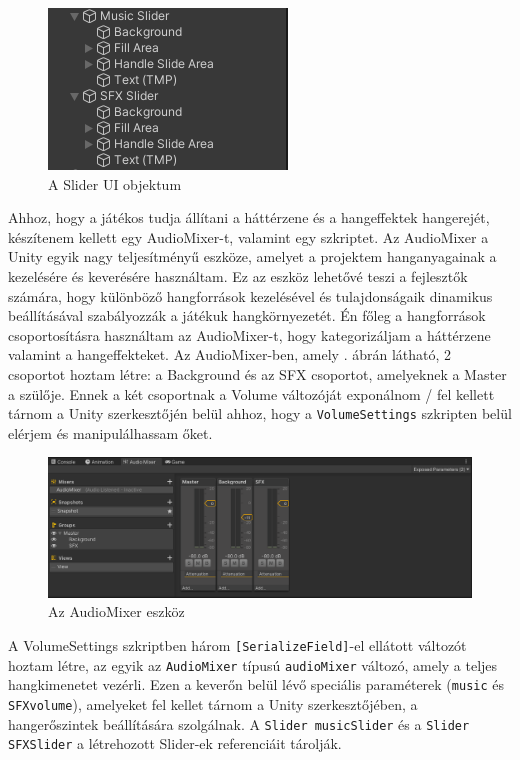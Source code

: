 \begin{figure}[ht]
\centering
\includegraphics[scale = 0.7]{images/slider.png}
\caption{A Slider UI objektum}
\label{fig:slider}
\end{figure}

\newpage
Ahhoz, hogy a játékos tudja állítani a háttérzene és a hangeffektek hangerejét, készítenem kellett egy AudioMixer-t, valamint egy szkriptet. Az AudioMixer a Unity egyik nagy teljesítményű eszköze, amelyet a projektem hanganyagainak a kezelésére és keverésére használtam. Ez az eszköz lehetővé teszi a fejlesztők számára, hogy különböző hangforrások kezelésével és tulajdonságaik dinamikus beállításával szabályozzák a játékuk hangkörnyezetét. Én főleg a hangforrások csoportosításra használtam az AudioMixer-t, hogy kategorizáljam a háttérzene valamint a hangeffekteket. Az AudioMixer-ben, amely . ábrán látható, 2 csoportot hoztam létre: a Background és az SFX csoportot, amelyeknek a Master a szülője. Ennek a két csoportnak a Volume változóját exponálnom / fel kellett tárnom a Unity szerkesztőjén belül ahhoz, hogy a \texttt{VolumeSettings} szkripten belül elérjem és manipulálhassam őket.

\begin{figure}
\centering
\includegraphics[scale = 0.4]{images/audiomixer.png}
\caption{Az AudioMixer eszköz}
\label{fig:audiomixer}
\end{figure}

A VolumeSettings szkriptben három \texttt{[SerializeField]}-el ellátott változót hoztam létre, az egyik az \texttt{AudioMixer} típusú \texttt{audioMixer} változó, amely a teljes hangkimenetet vezérli. Ezen a keverőn belül lévő speciális paraméterek (\texttt{music} és \texttt{SFXvolume}), amelyeket fel kellet tárnom a Unity szerkesztőjében, a hangerőszintek beállítására szolgálnak. A \texttt{Slider musicSlider} és a \texttt{Slider SFXSlider} a létrehozott Slider-ek referenciáit tárolják.

